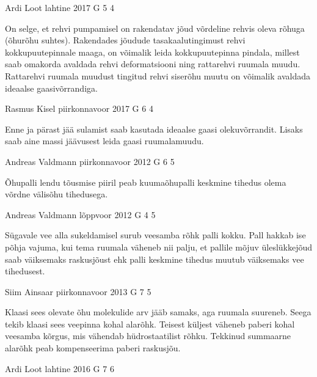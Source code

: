 \documentclass[11pt]{article}
\begin{document}
{%
{Ardi Loot} %
{lahtine} %
{2017} %
{G 5} %
{4} %
{

\ifHint
On selge, et rehvi pumpamisel on rakendatav jõud võrdeline rehvis oleva rõhuga (õhurõhu suhtes). Rakendades jõudude tasakaalutingimust rehvi kokkupuutepinnale maaga, on võimalik leida kokkupuutepinna pindala, millest saab omakorda avaldada rehvi deformatsiooni ning rattarehvi ruumala muudu. Rattarehvi ruumala muudust tingitud rehvi siserõhu muutu on võimalik avaldada ideaalse gaasivõrrandiga.
\fi
}

{Rasmus Kisel} %
{piirkonnavoor} %
{2017} %
{G 6} %
{4} %
{

\ifHint
Enne ja pärast jää sulamist saab kasutada ideaalse gaasi olekuvõrrandit. Lisaks saab aine massi jäävusest leida gaasi ruumalamuudu.
\fi
}

{Andreas Valdmann} %
{piirkonnavoor} %
{2012} %
{G 6} %
{5} %
{

\ifHint
Õhupalli lendu tõusmise piiril peab kuumaõhupalli keskmine tihedus olema võrdne välisõhu tihedusega.
\fi
}

{Andreas Valdmann} %
{lõppvoor} %
{2012} %
{G 4} %
{5} %
{

\ifHint
Sügavale vee alla sukeldamisel surub veesamba rõhk palli kokku. Pall hakkab ise põhja vajuma, kui tema ruumala väheneb nii palju, et pallile mõjuv üleslükkejõud saab väiksemaks raskusjõust ehk palli keskmine tihedus muutub väiksemaks vee tihedusest.
\fi
}

{Siim Ainsaar} %
{piirkonnavoor} %
{2013} %
{G 7} %
{5} %
{

\ifHint
Klaasi sees olevate õhu molekulide arv jääb samaks, aga ruumala suureneb. Seega tekib klaasi sees veepinna kohal alarõhk. Teisest küljest väheneb paberi kohal veesamba kõrgus, mis vähendab hüdrostaatilist rõhku. Tekkinud summaarne alarõhk peab kompenseerima paberi raskusjõu.
\fi
}

{Ardi Loot} %
{lahtine} %
{2016} %
{G 7} %
{6} %
{

}}
\end{document}
